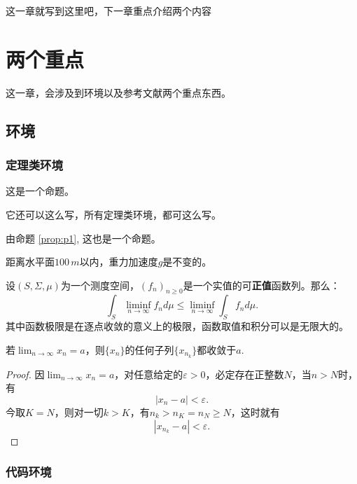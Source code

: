 这一章就写到这里吧，下一章重点介绍两个内容

\chapter{两个重点}
这一章，会涉及到环境以及参考文献两个重点东西。

\section{环境}
\subsection{定理类环境}

\begin{proposition}\label{prop:p1}
这是一个命题。
\end{proposition}

它还可以这么写，所有定理类环境，都可这么写。

\begin{proposition}[命题名]
由命题 \ref{prop:p1}, 这也是一个命题。
\end{proposition}

\begin{assumption}
距离水平面$100\,m$以内，重力加速度$g$是不变的。
\end{assumption}

\begin{lemma}[法图引理]
设$(S,\Sigma,\mu)$为一个测度空间，$(f_n)_{n\geq 0}$是一个实值的可\textbf{正值}函数列。那么：
\[
\int_S \liminf_{n\rightarrow \infty} f_n d\mu \leqslant \liminf_{n\rightarrow \infty} \int_S f_n d\mu.
\]
其中函数极限是在逐点收敛的意义上的极限，函数取值和积分可以是无限大的。
\end{lemma}

\begin{theorem}
若$\lim_{n\rightarrow \infty} x_n = a$，则$\{x_n\}$的任何子列$\{x_{n_k}\}$都收敛于$a$.
\end{theorem}
\begin{proof}
因$\lim_{n\rightarrow \infty} x_n = a$，对任意给定的$\varepsilon > 0$，必定存在正整数$N$，当$n>N$时，有
\[
|x_n-a|<\varepsilon.
\]
今取$K=N$，则对一切$k>K$，有$n_k>n_K=n_N\geq N$，这时就有
\[
|x_{n_k} - a|<\varepsilon.
\]
\end{proof}

\subsection{代码环境}

